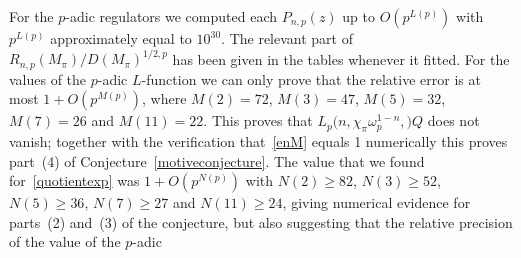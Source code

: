 \documentclass{amsart}
\begin{document}
\begin{example}
For the {$p$-adic{\futurelet{}}} regulators we computed each $ {P_{n,p}}(z) $ up to $ O(p^{L(p)}) $ with $ p^{L(p)} $
approximately equal to $ 10^{30} $.
The relevant part of $ {R_{n,p}(M_\pi)/D(M_\pi)^{1/2,p}} $ has been given in the tables whenever it fitted.
For the values of the {$p$-adic{\futurelet{}}} {$L$-function{\futurelet{}}} we can only prove that the
relative error is at most $  1+O(p^{M(p)}) $, 
where $ M(2) = 72$, $ M(3) = 47 $,  $ M(5) = 32 $, $ M(7) = 26 $ and $ M(11) = 22$.
This proves that $ {L_{p}(n,{\chi_\pi\omega_p^{1-n}},{\mathbb)}Q} $ does not vanish;
together with the verification that~\eqref{enM} equals 1 numerically this proves part~(4)
of Conjecture~\ref{motiveconjecture}.
The value that we found for~\eqref{quotientexp} was $ 1+O(p^{N(p)}) $ with $ N(2) \ge 82 $, 
$ N(3) \ge 52 $, $ N(5) \ge 36  $, $ N(7) \ge 27 $ and $ N(11) \ge 24 $, giving
numerical evidence for parts~(2) and~(3) of the conjecture, but also 
suggesting that the relative precision of the value of the {$p$-adic{\futurelet\comingchar{\relax\ifmmode\else
}}}
\end{example}
\end{document}
